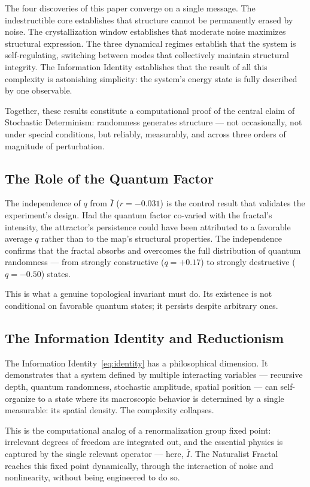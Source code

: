 \documentclass[twocolumn,amsmath,amssymb,prl]{revtex4-2}
\begin{document}
The four discoveries of this paper converge on a single message.  The
indestructible core establishes that structure cannot be permanently erased
by noise.  The crystallization window establishes that moderate noise
maximizes structural expression.  The three dynamical regimes establish that
the system is self-regulating, switching between modes that collectively
maintain structural integrity.  The Information Identity establishes that
the result of all this complexity is astonishing simplicity: the system's
energy state is fully described by one observable.

Together, these results constitute a computational proof of the central claim
of Stochastic Determinism: randomness generates structure — not occasionally,
not under special conditions, but reliably, measurably, and across three
orders of magnitude of perturbation.

\subsection{The Role of the Quantum Factor}

The independence of $q$ from $\overline{I}$ ($r = -0.031$) is the control
result that validates the experiment's design.  Had the quantum factor
co-varied with the fractal's intensity, the attractor's persistence could
have been attributed to a favorable average $q$ rather than to the map's
structural properties.  The independence confirms that the fractal absorbs
and overcomes the full distribution of quantum randomness — from strongly
constructive ($q = +0.17$) to strongly destructive ($q = -0.50$) states.

This is what a genuine topological invariant must do.  Its existence is not
conditional on favorable quantum states; it persists despite arbitrary ones.

\subsection{The Information Identity and Reductionism}

The Information Identity~\eqref{eq:identity} has a philosophical dimension.
It demonstrates that a system defined by multiple interacting variables —
recursive depth, quantum randomness, stochastic amplitude, spatial position —
can self-organize to a state where its macroscopic behavior is determined by
a single measurable: its spatial density.  The complexity collapses.

This is the computational analog of a renormalization group fixed point:
irrelevant degrees of freedom are integrated out, and the essential physics
is captured by the single relevant operator — here, $\overline{I}$.  The
Naturalist Fractal reaches this fixed point dynamically, through the
interaction of noise and nonlinearity, without being engineered to do so.
\end{document}
